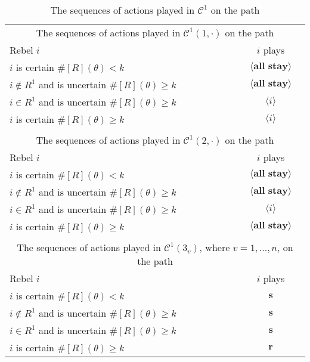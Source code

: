 \documentclass[12pt,letter]{article}
\newcommand{\Kappa}{\mathcal{C}}
\theoremstyle{definition}
\theoremstyle{remark}
\theoremstyle{claim}
\begin{document}
\begin{table}[!htbp]
\caption{The sequences of actions played in $\Kappa^1$ on the path}
\label{Table_cd0}
\begin{center}
\begin{tabular}{l c}
\multicolumn{2}{c}{The sequences of actions played in $\Kappa^1(1,\cdot)$ on the path}\\
Rebel $i$ 	 	&  	$i$ plays		 \\
\hline
\hline
$i$ is certain $\#[R](\theta)<k$ 	& 	$\langle \textbf{all stay} \rangle$	\\
$i\notin R^{1}$ and is uncertain $\#[R](\theta)\geq k$	& 	$\langle \textbf{all stay} \rangle$	\\
$i\in R^{1}$ and is uncertain $\#[R](\theta)\geq k$ &  $\langle i \rangle$  \\
$i$ is certain $\#[R](\theta)\geq k$ &  $\langle i \rangle$  \\
\hline
\\
\multicolumn{2}{c}{The sequences of actions played in $\Kappa^1(2,\cdot)$ on the path}\\
Rebel $i$ 	 	&  	$i$ plays		 \\
\hline
\hline
$i$ is certain $\#[R](\theta)<k$ 	& 	$\langle \textbf{all stay} \rangle$	\\
$i\notin R^{1}$ and is uncertain $\#[R](\theta)\geq k$	& 	$\langle \textbf{all stay} \rangle$	\\
$i\in R^{1}$ and is uncertain $\#[R](\theta)\geq k$ &  $\langle i \rangle$  \\
$i$ is certain $\#[R](\theta)\geq k$ &  $\langle \textbf{all stay} \rangle$  \\
\hline
\\
\multicolumn{2}{c}{The sequences of actions played in $\Kappa^1(3_v)$, where $v=1,...,n$, on the path}\\
Rebel $i$ 	 	&  	$i$ plays		 \\
\hline
\hline
$i$ is certain $\#[R](\theta)<k$ 	& 	$ \textbf{s} $	\\
$i\notin R^{1}$ and is uncertain $\#[R](\theta)\geq k$	& 	$ \textbf{s} $	\\
$i\in R^{1}$ and is uncertain $\#[R](\theta)\geq k$ &  $ \textbf{s} $  \\
$i$ is certain $\#[R](\theta)\geq k$ &  $ \textbf{r} $  \\
\hline
\end{tabular}
\end{center}
\end{table}
\end{document}
